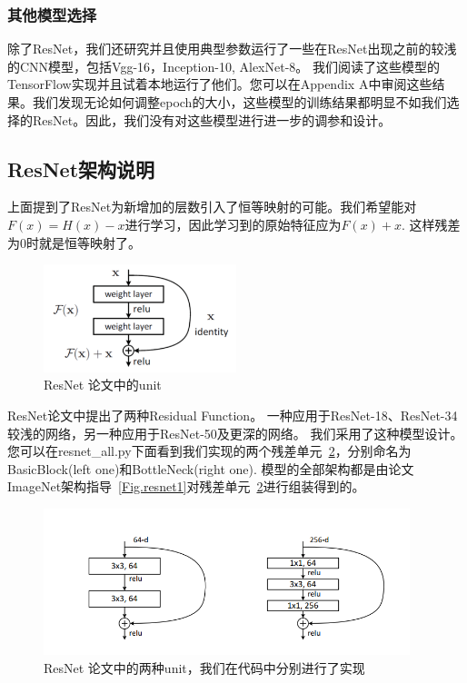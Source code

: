 \documentclass[hyperref, UTF8, 12pt]{article}
\theoremstyle{definition}
\begin{document}
\subsubsection{其他模型选择}
除了ResNet，我们还研究并且使用典型参数运行了一些在ResNet出现之前的较浅的CNN模型，包括Vgg-16，Inception-10, AlexNet-8。 我们阅读了这些模型的TensorFlow实现并且试着本地运行了他们。您可以在Appendix A中审阅这些结果。我们发现无论如何调整epoch的大小，这些模型的训练结果都明显不如我们选择的ResNet。因此，我们没有对这些模型进行进一步的调参和设计。

\subsection{ResNet架构说明}
上面提到了ResNet为新增加的层数引入了恒等映射的可能。我们希望能对$F(x) = H(x) - x$进行学习，因此学习到的原始特征应为$F(x) + x$. 这样残差为0时就是恒等映射了。\\
\begin{figure}[h] %
	\centering %
	\includegraphics[width=0.5\textwidth]{resnetUnit.png} %
	\caption{ResNet 论文中的unit} %
	\label{Fig.resnet2} %
\end{figure}
\indent
ResNet论文中提出了两种Residual Function。 一种应用于ResNet-18、ResNet-34较浅的网络，另一种应用于ResNet-50及更深的网络。 我们采用了这种模型设计。您可以在resnet\_all.py下面看到我们实现的两个残差单元~\ref{Fig.resnet4}，分别命名为BasicBlock(left one)和BottleNeck(right one). 模型的全部架构都是由论文ImageNet架构指导~\ref{Fig.resnet1}对残差单元~\ref{Fig.resnet4}进行组装得到的。\\
\begin{figure}[h] %
	\centering %
	\includegraphics[width=0.95\textwidth]{resnet2units.png} %
	\caption{ResNet 论文中的两种unit，我们在代码中分别进行了实现} %
	\label{Fig.resnet4} %
\end{figure}
\end{document}
